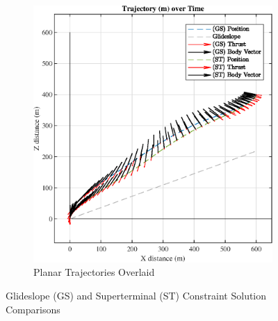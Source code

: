 \begin{figure}[htpb!]
\begin{subfigure}{.5\textwidth}
  \includegraphics[width=1\linewidth]{figs/ST_traj.eps}
  \caption{Planar Trajectories Overlaid}
  \label{fig:ST_traj}
\end{subfigure}
\caption{Glideslope (GS) and Superterminal (ST) Constraint Solution Comparisons}
\label{fig:STtraj}
\end{figure}


